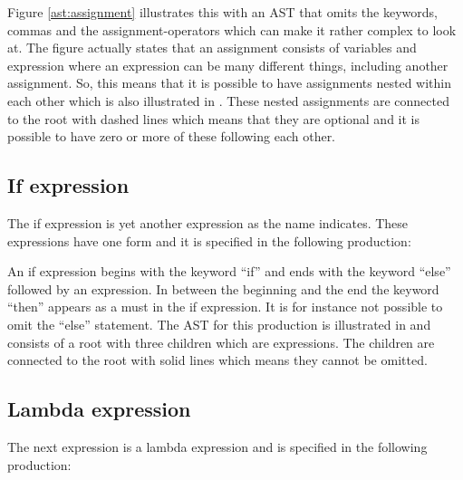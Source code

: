 %

Figure \ref{ast:assignment} illustrates this with an AST that omits the keywords, commas and the assignment-operators which can make it rather complex to look at. The figure actually states that an assignment consists of variables and expression where an expression can be many different things, including another assignment. So, this means that it is possible to have assignments nested within each other which is also illustrated in . These nested assignments are connected to the root with dashed lines which means that they are optional and it is possible to have zero or more of these following each other.%

\subsection{If expression}%

The if expression is yet another expression as the name indicates. These expressions have one form and it is specified in the following production:%

\begin{ebnf}%
%
\end{ebnf}%

An if expression begins with the keyword ``if'' and ends with the keyword ``else'' followed by an expression. In between the beginning and the end the keyword ``then'' appears as a must in the if expression. It is for instance not possible to omit the ``else'' statement. The AST for this production is illustrated in  and consists of a root with three children which are expressions. The children are connected to the root with solid lines which means they cannot be omitted.%

%

\subsection{Lambda expression}%

The next expression is a lambda expression and is specified in the following production:%

\begin{ebnf}%
%
\end{ebnf}%

